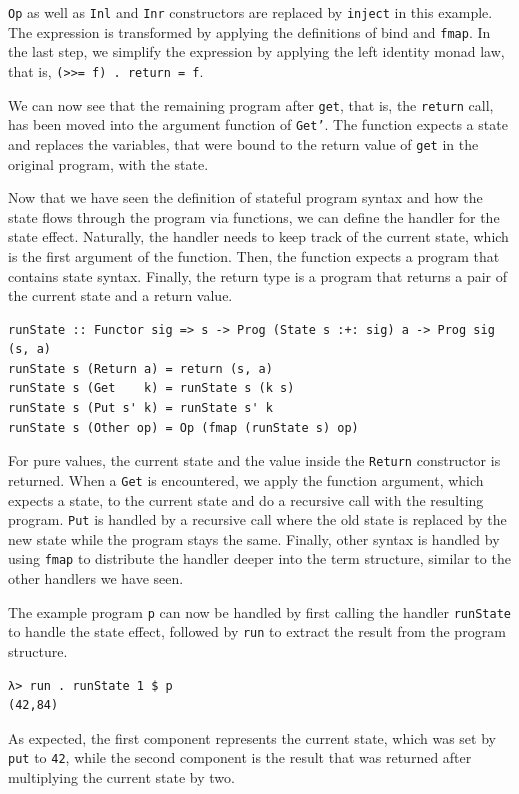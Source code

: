 \documentclass[a4paper, 11pt, fleqn, twoside]{scrreprt}
\newcommand{\hinl}[1]{\texttt{#1}}
\begin{document}
\hinl{Op} as well as \hinl{Inl} and \hinl{Inr} constructors are replaced by \hinl{inject} in this example.
The expression is transformed by applying the definitions of bind and \hinl{fmap}.
In the last step, we simplify the expression by applying the left identity monad law, that is, \hinl{(>>= f) . return = f}.

We can now see that the remaining program after \hinl{get}, that is, the \hinl{return} call, has been moved into the argument function of \hinl{Get'}.
The function expects a state and replaces the variables, that were bound to the return value of \hinl{get} in the original program, with the state.

Now that we have seen the definition of stateful program syntax and how the state flows through the program via functions, we can define the handler for the state effect.
Naturally, the handler needs to keep track of the current state, which is the first argument of the function.
Then, the function expects a program that contains state syntax.
Finally, the return type is a program that returns a pair of the current state and a return value.

\begin{verbatim}
runState :: Functor sig => s -> Prog (State s :+: sig) a -> Prog sig (s, a)
runState s (Return a) = return (s, a)
runState s (Get    k) = runState s (k s)
runState s (Put s' k) = runState s' k
runState s (Other op) = Op (fmap (runState s) op)
\end{verbatim}

For pure values, the current state and the value inside the \hinl{Return} constructor is returned.
When a \hinl{Get} is encountered, we apply the function argument, which expects a state, to the current state and do a recursive call with the resulting program.
\hinl{Put} is handled by a recursive call where the old state is replaced by the new state while the program stays the same.
Finally, other syntax is handled by using \hinl{fmap} to distribute the handler deeper into the term structure, similar to the other handlers we have seen.

The example program \hinl{p} can now be handled by first calling the handler \hinl{runState} to handle the state effect, followed by \hinl{run} to extract the result from the program structure.

\begin{verbatim}
λ> run . runState 1 $ p
(42,84)
\end{verbatim}

As expected, the first component represents the current state, which was set by \hinl{put} to \hinl{42}, while the second component is the result that was returned after multiplying the current state by two.
\end{document}

